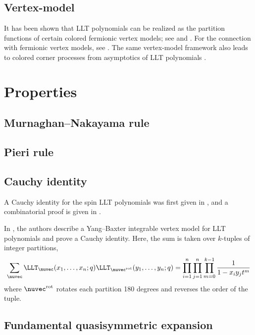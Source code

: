 \subsection[lltVertexModel]{Vertex-model}

It has been shown that LLT polynomials can be realized as the partition
functions of certain colored fermionic vertex models; see
\cite{CorteelGitlinKeatingMeza2021} and \cite{AggarwalBorodinWheeler2023}.
For the connection with fermionic vertex models, see
\cite{BrubakerBuciumasBumpGustafsson2020}.
The same vertex-model framework also leads to colored corner processes from
asymptotics of LLT polynomials \cite{AggarwalBorodinWheeler2024}.


\section[lltProperties]{Properties}

\subsection[lltMurnaghanNakayama]{Murnaghan--Nakayama rule}

\subsection[lltPieri]{Pieri rule}

\subsection[lltCauchy]{Cauchy identity}

A Cauchy identity for the spin LLT polynomials was first given in \cite{Lam2005},
and a combinatorial proof is given in \cite{Leeuwen2005}.

In \cite{CorteelGitlinKeatingMeza2021}, the authors describe a
Yang--Baxter integrable vertex model for LLT polynomials and prove a Cauchy
identity.
Here, the sum is taken over $k$-tuples of integer partitions,
\[
  \sum_{\nuvec}
  \LLT_\nuvec(x_1,\dotsc,x_n;q)
  \LLT_{\nuvec^{\mathrm{rot}}}(y_1,\dotsc,y_n;q)
  =
  \prod_{i=1}^n
  \prod_{j=1}^n
  \prod_{m=0}^{k-1} \frac{1}{1-x_iy_j t^m}
\]
where $\nuvec^{\mathrm{rot}}$ rotates each partition 180 degrees and reverses
the order of the tuple.


\subsection[lltFundamentalExpansion]{Fundamental quasisymmetric expansion}

